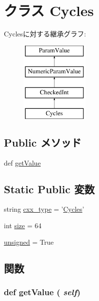 \hypertarget{classm5_1_1params_1_1Cycles}{
\section{クラス Cycles}
\label{classm5_1_1params_1_1Cycles}
}
Cyclesに対する継承グラフ:\begin{figure}[H]
\begin{center}
\leavevmode
\includegraphics[height=4cm]{classm5_1_1params_1_1Cycles}
\end{center}
\end{figure}
\subsection*{Public メソッド}
\begin{DoxyCompactItemize}
\item 
def \hyperlink{classm5_1_1params_1_1Cycles_acc340fbd4335fa34f9d57fb454b28ed0}{getValue}
\end{DoxyCompactItemize}
\subsection*{Static Public 変数}
\begin{DoxyCompactItemize}
\item 
string \hyperlink{classm5_1_1params_1_1Cycles_a2f1553ebb79374a68b36fdd6d8d82fc3}{cxx\_\-type} = '\hyperlink{classm5_1_1params_1_1Cycles}{Cycles}'
\item 
int \hyperlink{classm5_1_1params_1_1Cycles_a439227feff9d7f55384e8780cfc2eb82}{size} = 64
\item 
\hyperlink{classm5_1_1params_1_1Cycles_aca40206900cfc164654362fa8d4ad1e6}{unsigned} = True
\end{DoxyCompactItemize}


\subsection{関数}
\hypertarget{classm5_1_1params_1_1Cycles_acc340fbd4335fa34f9d57fb454b28ed0}{
\subsubsection[{getValue}]{\setlength{\rightskip}{0pt plus 5cm}def getValue ( {\em self})}}
\label{classm5_1_1params_1_1Cycles_acc340fbd4335fa34f9d57fb454b28ed0}


